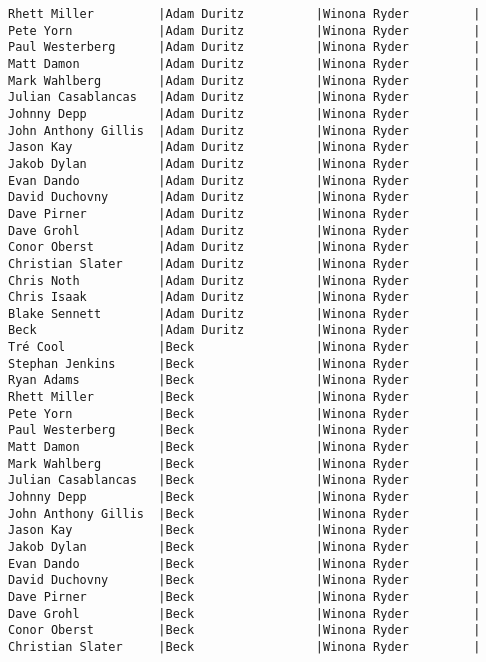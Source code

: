 \documentclass{article}
\begin{document}
\begin{verbatim}
Rhett Miller         |Adam Duritz          |Winona Ryder         |
Pete Yorn            |Adam Duritz          |Winona Ryder         |
Paul Westerberg      |Adam Duritz          |Winona Ryder         |
Matt Damon           |Adam Duritz          |Winona Ryder         |
Mark Wahlberg        |Adam Duritz          |Winona Ryder         |
Julian Casablancas   |Adam Duritz          |Winona Ryder         |
Johnny Depp          |Adam Duritz          |Winona Ryder         |
John Anthony Gillis  |Adam Duritz          |Winona Ryder         |
Jason Kay            |Adam Duritz          |Winona Ryder         |
Jakob Dylan          |Adam Duritz          |Winona Ryder         |
Evan Dando           |Adam Duritz          |Winona Ryder         |
David Duchovny       |Adam Duritz          |Winona Ryder         |
Dave Pirner          |Adam Duritz          |Winona Ryder         |
Dave Grohl           |Adam Duritz          |Winona Ryder         |
Conor Oberst         |Adam Duritz          |Winona Ryder         |
Christian Slater     |Adam Duritz          |Winona Ryder         |
Chris Noth           |Adam Duritz          |Winona Ryder         |
Chris Isaak          |Adam Duritz          |Winona Ryder         |
Blake Sennett        |Adam Duritz          |Winona Ryder         |
Beck                 |Adam Duritz          |Winona Ryder         |
Tré Cool             |Beck                 |Winona Ryder         |
Stephan Jenkins      |Beck                 |Winona Ryder         |
Ryan Adams           |Beck                 |Winona Ryder         |
Rhett Miller         |Beck                 |Winona Ryder         |
Pete Yorn            |Beck                 |Winona Ryder         |
Paul Westerberg      |Beck                 |Winona Ryder         |
Matt Damon           |Beck                 |Winona Ryder         |
Mark Wahlberg        |Beck                 |Winona Ryder         |
Julian Casablancas   |Beck                 |Winona Ryder         |
Johnny Depp          |Beck                 |Winona Ryder         |
John Anthony Gillis  |Beck                 |Winona Ryder         |
Jason Kay            |Beck                 |Winona Ryder         |
Jakob Dylan          |Beck                 |Winona Ryder         |
Evan Dando           |Beck                 |Winona Ryder         |
David Duchovny       |Beck                 |Winona Ryder         |
Dave Pirner          |Beck                 |Winona Ryder         |
Dave Grohl           |Beck                 |Winona Ryder         |
Conor Oberst         |Beck                 |Winona Ryder         |
Christian Slater     |Beck                 |Winona Ryder         |

\end{verbatim}
\end{document}
